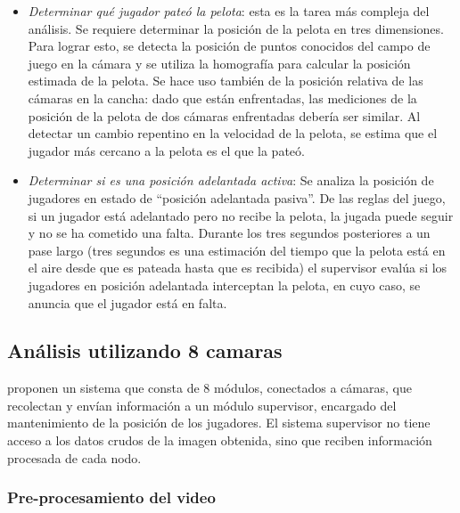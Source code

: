 \documentclass[a4paper,10pt]{article}
\begin{document}
\begin{itemize}

  \item \textit{Determinar qué jugador pateó la pelota}: esta es la tarea más
    compleja del análisis. Se requiere determinar la posición de la pelota en
    tres dimensiones. Para lograr esto, se detecta la posición de puntos
    conocidos del campo de juego en la cámara y se utiliza la homografía para
    calcular la posición estimada de la pelota. Se hace uso también de la
    posición relativa de las cámaras en la cancha: dado que están enfrentadas,
    las mediciones de la posición de la pelota de dos cámaras enfrentadas
    debería ser similar. Al detectar un cambio repentino en la velocidad de
    la pelota, se estima que el jugador más cercano a la pelota es el que
    la pateó.

  \item \textit{Determinar si es una posición adelantada activa}: Se analiza
    la posición de jugadores en estado de ``posición adelantada pasiva''. De
    las reglas del juego, si un jugador está adelantado pero no recibe la
    pelota, la jugada puede seguir y no se ha cometido una falta. Durante los
    tres segundos posteriores a un pase largo (tres segundos es una estimación
    del tiempo que la pelota está en el aire desde que es pateada hasta que es
    recibida) el supervisor evalúa si los jugadores en posición adelantada
    interceptan la pelota, en cuyo caso, se anuncia que el jugador está en
    falta.

\end{itemize}

\subsection{Análisis utilizando 8 camaras}
\label{sec:8-camaras}

\citeauthor*{xu-8cams} proponen un sistema que consta de 8 módulos, conectados
a cámaras, que recolectan y envían información
a un módulo supervisor, encargado del mantenimiento de la posición de los
jugadores. El sistema supervisor no tiene acceso a los datos crudos de la
imagen obtenida, sino que reciben información procesada de cada nodo.

\subsubsection{Pre-procesamiento del video}
\end{document}
